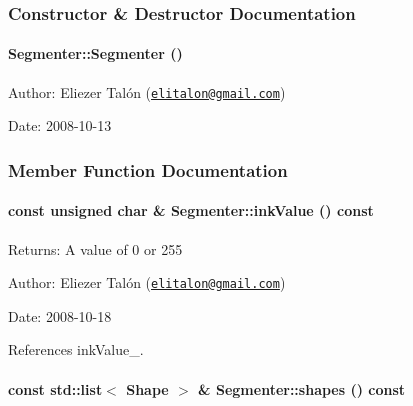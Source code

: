 \subsubsection{Constructor \& Destructor Documentation}
\hypertarget{class_segmenter_d39ec3bda31be180820aa0bdca7b125d}{
\paragraph[Segmenter]{\setlength{\rightskip}{0pt plus 5cm}Segmenter::Segmenter ()}\hfill}
\label{class_segmenter_d39ec3bda31be180820aa0bdca7b125d}


\begin{Desc}
\item[Author:]Eliezer Talón (\href{mailto:elitalon@gmail.com}{\tt elitalon@gmail.com}) \end{Desc}
\begin{Desc}
\item[Date:]2008-10-13 \end{Desc}


\subsubsection{Member Function Documentation}
\hypertarget{class_segmenter_e9bc56ddcbe5ea4abb40fcc85e3d9fbe}{
\paragraph[inkValue]{\setlength{\rightskip}{0pt plus 5cm}const unsigned char \& Segmenter::inkValue () const}\hfill}
\label{class_segmenter_e9bc56ddcbe5ea4abb40fcc85e3d9fbe}


\begin{Desc}
\item[Returns:]A value of 0 or 255\end{Desc}
\begin{Desc}
\item[Author:]Eliezer Talón (\href{mailto:elitalon@gmail.com}{\tt elitalon@gmail.com}) \end{Desc}
\begin{Desc}
\item[Date:]2008-10-18 \end{Desc}


References inkValue\_\-.\hypertarget{class_segmenter_7ddded12f26e94e6f5cba2752d2c4142}{
\paragraph[shapes]{\setlength{\rightskip}{0pt plus 5cm}const std::list$<$ {\bf Shape} $>$ \& Segmenter::shapes () const}\hfill}
\label{class_segmenter_7ddded12f26e94e6f5cba2752d2c4142}


